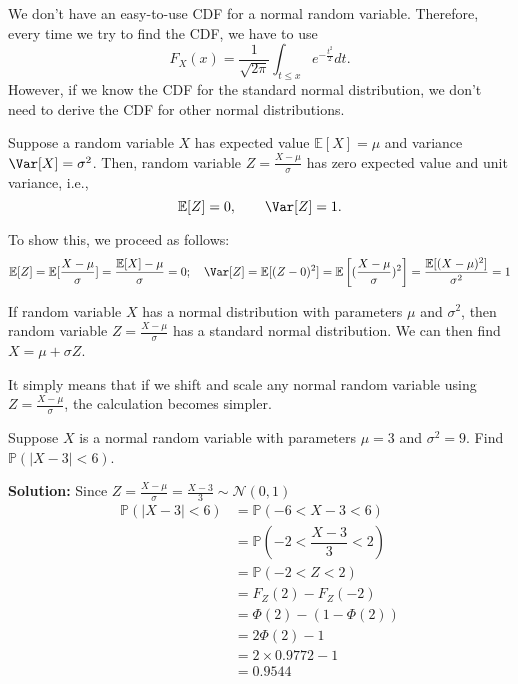 We don't have an easy-to-use CDF for a normal random variable. Therefore, every time we try to find the CDF, we have to use
\[
    F_X(x) = \dfrac{1}{\sqrt{2\pi}} \int_{t \leq x} e^{-\frac{t^2}{2}}dt. 
\]
However, if we know the CDF for the standard normal distribution, we don't need to derive the CDF for other normal distributions.

Suppose a random variable \(X\) has expected value \(\mathbb{E}[X] = \mu\) and variance \(\Var[X] = \sigma^2\). Then, random variable \(Z = \frac{X - \mu}{\sigma}\) has zero expected value and unit variance, i.e.,
\[
    \mathbb{E}[Z] = 0, \quad\quad \Var[Z] = 1.
\]

To show this, we proceed as follows: 
\[
    \mathbb{E}[Z] = \mathbb{E}[\dfrac{X - \mu}{\sigma}] = \dfrac{\mathbb{E}[X] - \mu}{\sigma} = 0 ;\quad \Var[Z] = \mathbb{E}[(Z - 0)^2] = \mathbb{E}\left[(\dfrac{X - \mu}{\sigma})^2\right] = \dfrac{\mathbb{E}[(X - \mu)^2]}{\sigma^2} = 1
\]

If random variable \(X\) has a normal distribution with parameters \(\mu\) and \(\sigma^2\), then random variable \(Z = \frac{X - \mu}{\sigma}\) has a standard normal distribution. We can then find \(X = \mu + \sigma Z\). 

It simply means that if we shift and scale any normal random variable using \(Z = \frac{X - \mu}{\sigma}\), the calculation becomes simpler.

\begin{eg}
    Suppose \(X\) is a normal random variable with parameters \(\mu = 3\) and \(\sigma^2 = 9\). Find \(\mathbb{P}(\vert X - 3 \vert < 6)\).

    \textbf{Solution:} 
    Since \(Z = \frac{X - \mu}{\sigma} = \frac{X - 3}{3} \sim \mathcal{N}(0, 1)\) 
    \[
        \begin{aligned}
            \mathbb{P}(\vert X - 3 \vert < 6) &= \mathbb{P}(-6 <  X - 3 < 6) \\
            &= \mathbb{P}(-2 < \dfrac{X - 3}{3} < 2) \\
            &= \mathbb{P}(-2 < Z < 2) \\
            &= F_Z(2) - F_Z(-2) \\
            &= \varPhi (2) - (1 - \varPhi (2)) \\
            &= 2\varPhi (2) - 1 \\
            &= 2 \times 0.9772 - 1 \\
            &= 0.9544
        \end{aligned}
    \]
\end{eg}

